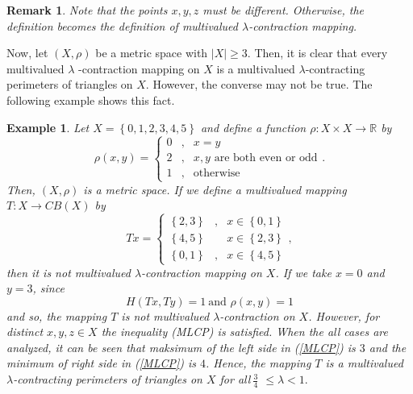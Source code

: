 \documentclass[reqno,11pt]{amsart}
\theoremstyle{plain}
\newtheorem{example}{Example}
\newtheorem{remark}{Remark}
\numberwithin{equation}{section}
\begin{document}
\begin{remark}
Note that the points $x,y,z$ must be different. Otherwise, the definition
becomes the definition of multivalued $\lambda $-contraction mapping.
\end{remark}

Now, let $\left( X,\rho \right) $ be a metric space with $\left \vert
X\right \vert \geq 3$. Then, it is clear that every multivalued $\lambda $%
-contraction mapping on $X$ is a multivalued $\lambda $-contracting
perimeters of triangles on $X$. However, the converse may not be true. The
following example shows this fact.

\begin{example}
\label{Ex1}Let $X=\left \{ 0,1,2,3,4,5\right \} $ and define a function $%
\rho :X\times X\rightarrow 
\mathbb{R}
$ by 
\begin{equation*}
\rho (x,y)=\left \{ 
\begin{array}{ccc}
0 & , & x=y \\ 
2 & , & x,y\text{ are both even or odd} \\ 
1 & , & \text{otherwise}%
\end{array}%
\right. .
\end{equation*}%
Then, $\left( X,\rho \right) $ is a metric space. If we define a multivalued
mapping $T:X\rightarrow CB\left( X\right) $ by 
\begin{equation*}
Tx=\left \{ 
\begin{array}{ccc}
\left \{ 2,3\right \} & , & x\in \left \{ 0,1\right \} \\ 
\left \{ 4,5\right \} &  & x\in \left \{ 2,3\right \} \\ 
\left \{ 0,1\right \} & , & x\in \left \{ 4,5\right \}%
\end{array}%
\right. ,
\end{equation*}%
then it is not multivalued $\lambda $-contraction mapping on $X$. If we take 
$x=0$ and $y=3$, since 
\begin{equation*}
H(Tx,Ty)=1~\text{and }\rho (x,y)=1
\end{equation*}%
and so, the mapping $T$ is not multivalued $\lambda $-contraction on $X$.
However, for distinct $x,y,z\in X$ the inequality (MLCP) is satisfied. When
the all cases are analyzed, it can be seen that maksimum of the left side in
(\ref{MLCP}) is $3$ and the minimum of right side in (\ref{MLCP}) is $4$.
Hence, the mapping $T$ is a multivalued $\lambda $-contracting perimeters of
triangles on $X$ for all$~\frac{3}{4}$ $\leq \lambda <1.$
\end{example}
\end{document}
